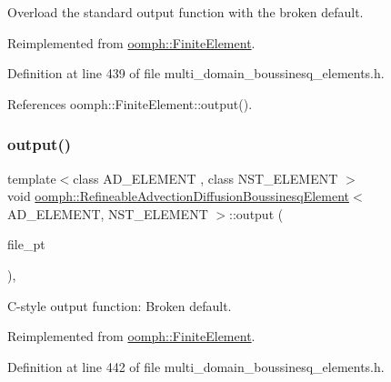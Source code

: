 Overload the standard output function with the broken default. 



Reimplemented from \hyperlink{classoomph_1_1FiniteElement_a2ad98a3d2ef4999f1bef62c0ff13f2a7}{oomph\+::\+Finite\+Element}.



Definition at line 439 of file multi\+\_\+domain\+\_\+boussinesq\+\_\+elements.\+h.



References oomph\+::\+Finite\+Element\+::output().

\mbox{\label{classoomph_1_1RefineableAdvectionDiffusionBoussinesqElement_ac8fa2a491b9c5bda7bcfdd93d0a00b11}} 
\subsubsection{\texorpdfstring{output()}{output()}\hspace{0.1cm}{\footnotesize\ttfamily [3/4]}}
{\footnotesize\ttfamily template$<$class A\+D\+\_\+\+E\+L\+E\+M\+E\+NT , class N\+S\+T\+\_\+\+E\+L\+E\+M\+E\+NT $>$ \\
void \hyperlink{classoomph_1_1RefineableAdvectionDiffusionBoussinesqElement}{oomph\+::\+Refineable\+Advection\+Diffusion\+Boussinesq\+Element}$<$ A\+D\+\_\+\+E\+L\+E\+M\+E\+NT, N\+S\+T\+\_\+\+E\+L\+E\+M\+E\+NT $>$\+::output (\begin{DoxyParamCaption}\item[{F\+I\+LE $\ast$}]{file\+\_\+pt }\end{DoxyParamCaption})\hspace{0.3cm}{\ttfamily [inline]}, {\ttfamily [virtual]}}



C-\/style output function\+: Broken default. 



Reimplemented from \hyperlink{classoomph_1_1FiniteElement_a72cddd09f8ddbee1a20a1ff404c6943e}{oomph\+::\+Finite\+Element}.



Definition at line 442 of file multi\+\_\+domain\+\_\+boussinesq\+\_\+elements.\+h.




